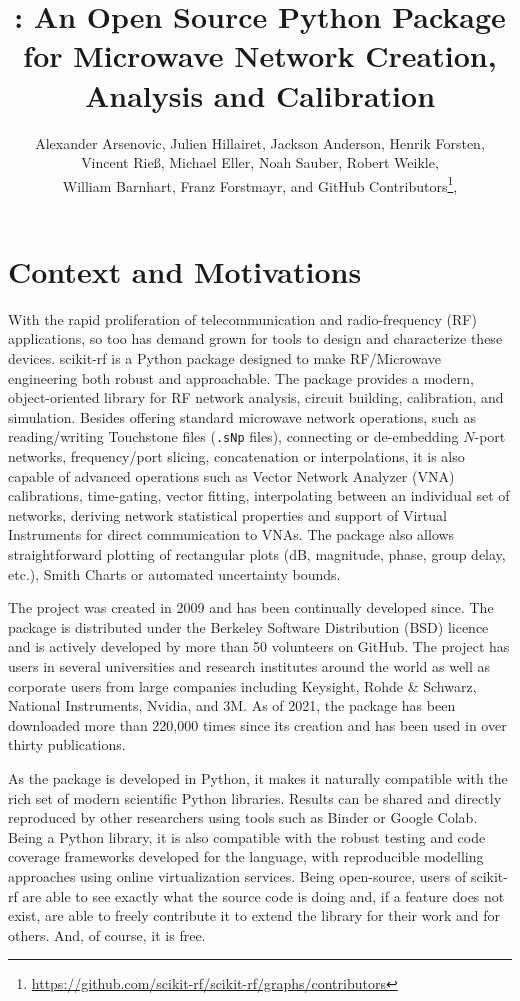 \documentclass[10pt, letterpaper]{scrartcl}
\title{\skrf{}: An Open Source Python Package for Microwave Network Creation, Analysis and Calibration}
\author{Alexander Arsenovic, %
	    Julien Hillairet, %
		Jackson Anderson, %
		Henrik Forsten, \\ %
		Vincent Rieß, %
 		Michael Eller, %
		Noah Sauber, %
		Robert Weikle, \\ %
		William Barnhart, %
		Franz Forstmayr, %
		and GitHub Contributors\footnote{\url{https://github.com/scikit-rf/scikit-rf/graphs/contributors}},  %
	}
\date{}
\newcommand{\skrf}{{s}cikit-rf\xspace}
\begin{document}
\maketitle

\section{Context and Motivations}
With the rapid proliferation of telecommunication and radio-frequency (RF) applications, so too has demand grown for tools to design and characterize these devices. \skrf{} is a Python package designed to make RF/Microwave engineering both robust and approachable. The package provides a modern, object-oriented library for RF network analysis, circuit building, calibration, and simulation. Besides offering standard microwave network operations, such as reading/writing Touchstone files (\texttt{.sNp} files), connecting or de-embedding $N$-port networks, frequency/port slicing, concatenation or interpolations, it is also capable of advanced operations such as Vector Network Analyzer (VNA) calibrations, time-gating, vector fitting, interpolating between an individual set of networks, deriving network statistical properties and support of Virtual Instruments for direct communication to VNAs. The package also allows straightforward plotting of rectangular plots (dB, magnitude, phase, group delay, etc.), Smith Charts or automated uncertainty bounds.
 
The project was created in 2009 and has been continually developed since. The package is distributed under the Berkeley Software Distribution (BSD) licence and is actively developed by more than 50 volunteers on GitHub. The project has users in several universities and research institutes around the world as well as corporate users from large companies including Keysight, Rohde \& Schwarz, National Instruments, Nvidia, and 3M. As of 2021, the package has been downloaded more than 220,000 times since its creation and has been used in over thirty publications.

As the package is developed in Python, it makes it naturally compatible with the rich set of modern scientific Python libraries. Results can be shared and directly reproduced by other researchers using tools such as Binder or Google Colab. Being a Python library, it is also compatible with the robust testing and code coverage frameworks developed for the language, with reproducible modelling approaches using online virtualization services. Being open-source, users of \skrf{} are able to see exactly what the source code is doing and, if a feature does not exist, are able to freely contribute it to extend the library for their work and for others. And, of course, it is free.
\end{document}
